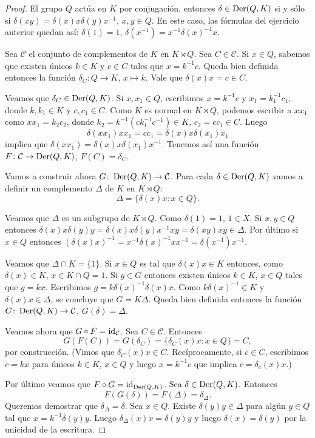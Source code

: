 \begin{proof}
	El grupo $Q$ actúa en $K$ por conjugación, entonces $\delta\in\operatorname{Der}(Q,K)$ si
	y sólo si $\delta(xy)=\delta(x)x\delta(y)x^{-1}$, $x,y\in Q$. En este caso,
	las fórmulas del ejercicio anterior quedan así:
	$\delta(1)=1$, $\delta(x^{-1})=x^{-1}\delta(x)^{-1}x$.
	
	Sea $\mathcal{C}$ el conjunto de complementos de $K$ en $K\rtimes Q$.  Sea
	$C\in\mathcal{C}$. Si $x\in Q$, sabemos que 
	existen únicos $k\in K$ y $c\in C$ tales que $x=k^{-1}c$. Queda bien
	definida entonces la función $\delta_C\colon Q\to K$, $x\mapsto k$. Vale
	que $\delta(x)x=c\in C$. 
	
	Veamos que $\delta_C\in\operatorname{Der}(Q,K)$. Si $x,x_1\in Q$, escribimos $x=k^{-1}c$
	y $x_1=k_1^{-1}c_1$, donde $k,k_1\in K$ y $c,c_1\in C$. Como $K$ es normal
	en $K\rtimes Q$, podemos escribir a $xx_1$ como $xx_1=k_2c_2$, donde
	$k_2=k^{-1}(ck_1^{-1}c^{-1})\in K$, $c_2=cc_1\in C$. Luego 
	\[
		\delta(xx_1)xx_1=cc_1=\delta(x)x\delta(x_1)x_1
	\]
	implica que $\delta(xx_1)=\delta(x)x\delta(x_1)x^{-1}$. 
	Tenemos así una función $F\colon\mathcal{C}\to\operatorname{Der}(Q,K)$, $F(C)=\delta_C$.

	Vamos a construir ahora $G\colon\operatorname{Der}(Q,K)\to\mathcal{C}$. 
	Para
	cada $\delta\in\operatorname{Der}(Q,K)$ vamos a definir un complemento $\Delta$ de $K$ en $K\rtimes Q$: 
	\[
	\Delta=\{\delta(x)x:x\in Q\}.
	\]

	Veamos que $\Delta$ es un subgrupo de $K\rtimes Q$. Como $\delta(1)=1$,
	$1\in X$. Si $x,y\in Q$ entonces
	$\delta(x)x\delta(y)y=\delta(x)x\delta(y)x^{-1}xy=\delta(xy)xy\in \Delta$.
	Por último si $x\in Q$ entonces
	$(\delta(x)x)^{-1}=x^{-1}\delta(x)^{-1}xx^{-1}=\delta(x^{-1})x^{-1}$.
	
	
	Veamos que $\Delta\cap K=\{1\}$. Si $x\in Q$ es tal que $\delta(x)x\in K$
	entonces, como $\delta(x)\in K$, $x\in K\cap Q=1$. Si $g\in G$ entonces
	existen únicos $k\in K$, $x\in Q$ tales que $g=kx$. Escribimos
	$g=k\delta(x)^{-1}\delta(x)x$. Como $k\delta(x)^{-1}\in K$ y $\delta(x)x\in
	\Delta$, se concluye que $G=K\Delta$. Queda bien definida entonces la
	función $G\colon\operatorname{Der}(Q,K)\to\mathcal{C}$, $G(\delta)=\Delta$.

	Veamos ahora que $G\circ F=\operatorname{id}_{\mathcal{C}}$. 
	Sea $C\in\mathcal{C}$. Entonces 
	\[
	G(F(C))=G(\delta_C)=\{\delta_C(x)x:x\in
	Q\}=C,
	\]
	por construcción. (Vimos que $\delta_C(x)x\in C$. Recíprocamente,  si $c\in
	C$, escribimos $c=kx$ para únicos $k\in K$, $x\in Q$ y luego $x=k^{-1}c$
	que implica $c=\delta_c(x)x$.)

	Por último veamos que $F\circ G=\operatorname{id}_{\operatorname{Der}(Q,K)}$. Sea $\delta\in\operatorname{Der}(Q,K)$.
	Entonces 
	\[
	F(G(\delta))=F(\Delta)=\delta_{\Delta}.
	\]
	Queremos demostrar que $\delta_\Delta=\delta$.  Sea $x\in Q$. Existe
	$\delta(y)y\in\Delta$ para algún $y\in Q$ tal que $x=k^{-1}\delta(y)y$.
	Luego $\delta_{\Delta}(x)x=\delta(y)y$ y luego $\delta(x)=\delta(y)$ por la
	unicidad de la escritura.
\end{proof}

